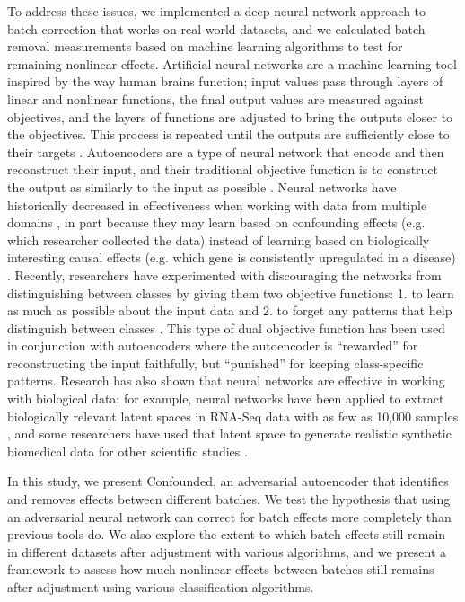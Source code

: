\documentclass[notitlepage]{article}
\begin{document}
To address these issues, we implemented a deep neural network approach to batch correction that works on real-world datasets, and we calculated batch removal measurements based on machine learning algorithms to test for remaining nonlinear effects.
Artificial neural networks are a machine learning tool inspired by the way human brains function; input values pass through layers of linear and nonlinear functions, the final output values are measured against objectives, and the layers of functions are adjusted to bring the outputs closer to the objectives.
This process is repeated until the outputs are sufficiently close to their targets \citep{schmidhuber_deep_2015}.
Autoencoders are a type of neural network that encode and then reconstruct their input, and their traditional objective function is to construct the output as similarly to the input as possible \citep{hinton_reducing_2006}.
Neural networks have historically decreased in effectiveness when working with data from multiple domains \citep{ganin_domain-adversarial_2015}, in part because they may learn based on confounding effects (e.g. which researcher collected the data) instead of learning based on biologically interesting causal effects (e.g. which gene is consistently upregulated in a disease) \citep{louizos_causal_2017-2}.
Recently, researchers have experimented with discouraging the networks from distinguishing between classes by giving them two objective functions:
1. to learn as much as possible about the input data and
2. to forget any patterns that help distinguish between classes \citep{ganin_domain-adversarial_2015,tzeng_deep_2014-2}.
This type of dual objective function has been used in conjunction with autoencoders \citep{louizos_variational_2015} where the autoencoder is ``rewarded'' for reconstructing the input faithfully, but ``punished'' for keeping class-specific patterns.
Research has also shown that neural networks are effective in working with biological data; for example, neural networks have been applied to extract biologically relevant latent spaces in RNA-Seq data with as few as 10,000 samples \citep{way_extracting_2017}, and some researchers have used that latent space to generate realistic synthetic biomedical data for other scientific studies \citep{beaulieu-jones_privacy-preserving_2017}.

In this study, we present Confounded, an adversarial autoencoder that identifies and removes effects between different batches.
We test the hypothesis that using an adversarial neural network can correct for batch effects more completely than previous tools do.
We also explore the extent to which batch effects still remain in different datasets after adjustment with various algorithms, and we present a framework to assess how much nonlinear effects between batches still remains after adjustment using various classification algorithms.
\end{document}

